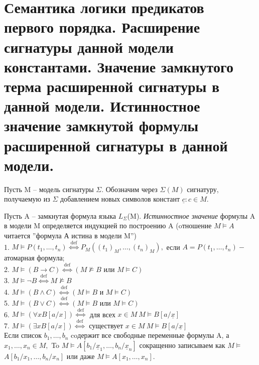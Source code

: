 \section{Семантика логики предикатов первого порядка. Расширение сигнатуры
данной модели константами. Значение замкнутого терма расширенной
сигнатуры в данной модели. Истинностное значение замкнутой формулы
расширенной сигнатуры в данной модели.}

Пусть M -- модель сигнатуры $\Sigma$. Обозначим через $ \Sigma(M)$ сигнатуру, получаемую из $  \Sigma$ добавлением
новых символов констант ${\underline {c} : c \in M. \label{formula5} } $


\begin{definition}
	Пусть A -- замкнутая формула языка $L_{\Sigma }$(M). \textit{Истинностное значение} формулы A в модели M
	определяется индукцией по построению A (oтношение $ M \vDash A $ читается ''формула А истина в модели M'')
	\label{formula6}  \\
	1. $M \vDash P\left(t_{1}, \ldots, t_{n}\right) \stackrel{\text { def }}{\Longleftrightarrow}
	P_{M}\left(\left(t_{1}\right)_{M}, \ldots,\left(t_{n}\right)_{M}\right),$ если $A=P\left(t_{1}, \ldots,
	t_{n}\right)-$
	атомарная формула;\\
	2. $M \vDash(B \rightarrow C) \stackrel{\text { def }}{\Longleftrightarrow}(M \nvDash B \text { или } M \vDash C)$ \\
	3. $M \vDash \neg B \stackrel{\text { def }}{\Longleftrightarrow} M \nvDash B$ \\
	4. $M \vDash(B \wedge C) \stackrel{\text { def }}{\Longleftrightarrow}\left(M \vDash B \text{ и } M \vDash C\right)$\\
	5. $M \vDash(B \vee C) \stackrel{\text { def }}{\Longleftrightarrow}(M \vDash B \text { или } M \vDash C)$ \\
	6. $M \vDash(\forall x B[a / x]) \stackrel{\text { def }}{\Longleftrightarrow}$ для всех $x \in M \ M \vDash B[a /
	\underline{x}]$ \\
	7. $M \vDash(\exists x B[a / x]) \stackrel{\text { def }}{\Longleftrightarrow}$ существует $x \in M \ M \vDash B[a
	/ \underline{x}]$ \\
	Если список $b_{1}, \ldots , b_{n}  $ coдержит все свободные переменные формулы A, а
	$x_{1}, \ldots, x_{n} \in M,$ To $M \vDash A\left[b_{1} / \underline{x}_{1}, \ldots, b_{n} /
	\underline{x}_{n}\right]$ сокращенно записываем как $M \vDash$
	$A\left[b_{1} / x_{1}, \ldots, b_{n} / x_{n}\right]$ или даже $M \vDash A\left[x_{1}, \ldots, x_{n}\right]$.

\end{definition}
